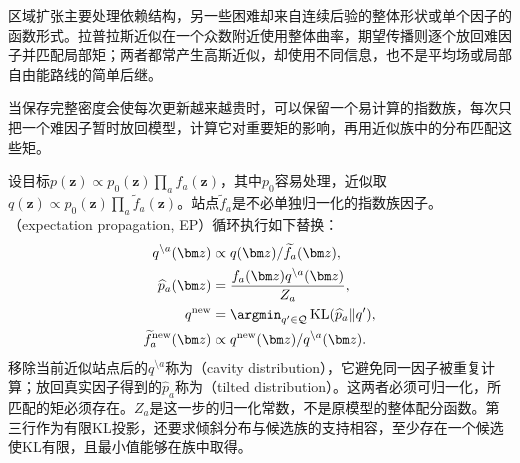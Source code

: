 区域扩张主要处理依赖结构，另一些困难却来自连续后验的整体形状或单个因子的函数形式。拉普拉斯近似在一个众数附近使用整体曲率，期望传播则逐个放回难因子并匹配局部矩；两者都常产生高斯近似，却使用不同信息，也不是平均场或局部自由能路线的简单后继。

当保存完整密度会使每次更新越来越贵时，可以保留一个易计算的指数族，每次只把一个难因子暂时放回模型，计算它对重要矩的影响，再用近似族中的分布匹配这些矩。

设目标$p(\bm z)\propto p_0(\bm z)\prod_a f_a(\bm z)$，其中$p_0$容易处理，近似取$q(\bm z)\propto p_0(\bm z)\prod_a\widetilde f_a(\bm z)$。站点$\widetilde f_a$是不必单独归一化的指数族因子。（expectation propagation, EP）循环执行如下替换：
\begin{equation}
  \begin{aligned}
    q^{\setminus a}(\bm z)&\propto q(\bm z)/\widetilde f_a(\bm z),\\
    \widehat p_a(\bm z)&=
       \frac{f_a(\bm z)q^{\setminus a}(\bm z)}{Z_a},\\
    q^{\mathrm{new}}&=
       \argmin_{q'\in\mathcal Q}
           \operatorname{KL}(\widehat p_a\Vert q'),\\
    \widetilde f_a^{\mathrm{new}}(\bm z)&\propto
       q^{\mathrm{new}}(\bm z)/q^{\setminus a}(\bm z).
  \end{aligned}
  \label{eq:pgm-variational-ep}
\end{equation}
移除当前近似站点后的$q^{\setminus a}$称为（cavity distribution），它避免同一因子被重复计算；放回真实因子得到的$\widehat p_a$称为（tilted distribution）。这两者必须可归一化，所匹配的矩必须存在。$Z_a$是这一步的归一化常数，不是原模型的整体配分函数。第三行作为有限KL投影，还要求倾斜分布与候选族的支持相容，至少存在一个候选使KL有限，且最小值能够在族中取得。

